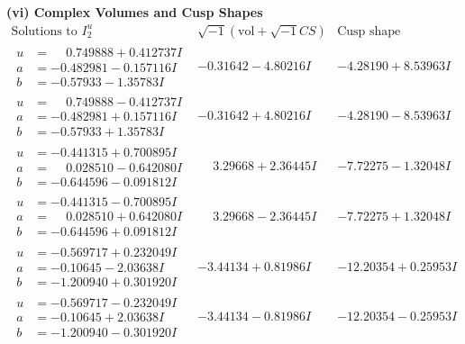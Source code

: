 \documentclass[1p]{elsarticle_modified}
\theoremstyle{definition}
\newcommand{\I}{\sqrt{-1}}
\begin{document}
\newpage\flushleft \textbf{(vi) Complex Volumes and Cusp Shapes}
$$\begin{array}{c|c|c}  
\text{Solutions to }I^u_{2}& \I (\text{vol} + \sqrt{-1}CS) & \text{Cusp shape}\\
 \hline 
\begin{aligned}
u &= \phantom{-}0.749888 + 0.412737 I \\
a &= -0.482981 - 0.157116 I \\
b &= -0.57933 - 1.35783 I\end{aligned}
 & -0.31642 - 4.80216 I & -4.28190 + 8.53963 I \\ \hline\begin{aligned}
u &= \phantom{-}0.749888 - 0.412737 I \\
a &= -0.482981 + 0.157116 I \\
b &= -0.57933 + 1.35783 I\end{aligned}
 & -0.31642 + 4.80216 I & -4.28190 - 8.53963 I \\ \hline\begin{aligned}
u &= -0.441315 + 0.700895 I \\
a &= \phantom{-}0.028510 - 0.642080 I \\
b &= -0.644596 - 0.091812 I\end{aligned}
 & \phantom{-}3.29668 + 2.36445 I & -7.72275 - 1.32048 I \\ \hline\begin{aligned}
u &= -0.441315 - 0.700895 I \\
a &= \phantom{-}0.028510 + 0.642080 I \\
b &= -0.644596 + 0.091812 I\end{aligned}
 & \phantom{-}3.29668 - 2.36445 I & -7.72275 + 1.32048 I \\ \hline\begin{aligned}
u &= -0.569717 + 0.232049 I \\
a &= -0.10645 - 2.03638 I \\
b &= -1.200940 + 0.301920 I\end{aligned}
 & -3.44134 + 0.81986 I & -12.20354 + 0.25953 I \\ \hline\begin{aligned}
u &= -0.569717 - 0.232049 I \\
a &= -0.10645 + 2.03638 I \\
b &= -1.200940 - 0.301920 I\end{aligned}
 & -3.44134 - 0.81986 I & -12.20354 - 0.25953 I \\ \hline\begin{aligned}

\end{aligned}
\end{array}$$
\end{document}
